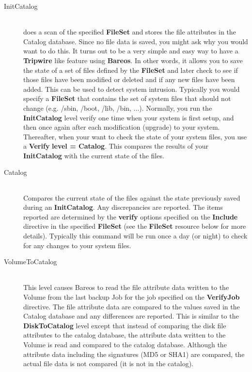 {\begin{description}
\begin{description}
\item [InitCatalog] \hfill \\
does a scan of the specified {\bf FileSet} and stores the file
attributes in the Catalog database.  Since no file data is saved, you
might ask why you would want to do this.  It turns out to be a very
simple and easy way to have a {\bf Tripwire} like feature using {\bf
Bareos}.  In other words, it allows you to save the state of a set of
files defined by the {\bf FileSet} and later check to see if those files
have been modified or deleted and if any new files have been added.
This can be used to detect system intrusion.  Typically you would
specify a {\bf FileSet} that contains the set of system files that
should not change (e.g.  /sbin, /boot, /lib, /bin, ...).  Normally, you
run the {\bf InitCatalog} level verify one time when your system is
first setup, and then once again after each modification (upgrade) to
your system.  Thereafter, when your want to check the state of your
system files, you use a {\bf Verify} {\bf level = Catalog}.  This
compares the results of your {\bf InitCatalog} with the current state of
the files.

\item [Catalog] \hfill \\
Compares the current state of the files against the state previously
saved during an {\bf InitCatalog}.  Any discrepancies are reported.  The
items reported are determined by the {\bf verify} options specified on
the {\bf Include} directive in the specified {\bf FileSet} (see the {\bf
FileSet} resource below for more details).  Typically this command will
be run once a day (or night) to check for any changes to your system
files.


\item [VolumeToCatalog] \hfill \\
This level causes Bareos to read the file attribute data written to the
Volume from the last backup Job for the job specified on the {\bf VerifyJob}
directive.  The file attribute data are compared to the
values saved in the Catalog database and any differences are reported.
This is similar to the {\bf DiskToCatalog} level except that instead of
comparing the disk file attributes to the catalog database, the
attribute data written to the Volume is read and compared to the catalog
database.  Although the attribute data including the signatures (MD5 or
SHA1) are compared, the actual file data is not compared (it is not in
the catalog).


\end{description}
\end{description}}

